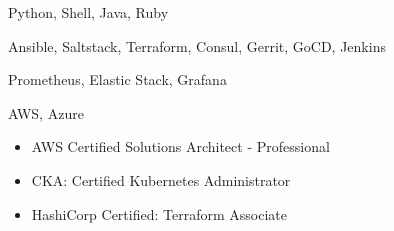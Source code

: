 \documentclass{resume}
\begin{document}
\smallskip


\begin{body}
\begin{description}[style=nextline,leftmargin=8em,topsep=1pt]
	\item[语言] Python, Shell, Java, Ruby
	\item[工具] Ansible, Saltstack, Terraform, Consul, Gerrit, GoCD, Jenkins
	\item[监控] Prometheus, Elastic Stack, Grafana
	\item[云服务] AWS, Azure
\end{description}
\end{body}





%




\begin{body}
	\begin{itemize}[noitemsep,topsep=0pt]
		\item AWS Certified Solutions Architect - Professional
		\item CKA: Certified Kubernetes Administrator
		\item HashiCorp Certified: Terraform Associate
	\end{itemize}
\end{body}


\end{document}

